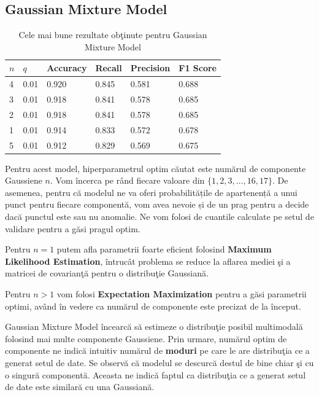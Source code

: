 \noindent

\subsection{Gaussian Mixture Model}

\begin{table}[H]
  \centering
  \begin{tabularx}{\textwidth}{
      |X
      |X
      |X
      |X
      |X
      |X|
  }
  \hline
  $n$ & $q$ & {Accuracy} & {Recall} & {Precision} & {F1 Score} \\
  \hline
  \rowcolor{gray!20} 4 & 0.01 & 0.920 & 0.845 & 0.581 & 0.688  \\
  3	& 0.01 & 0.918	& 0.841 & 0.578 & 0.685 \\
  \rowcolor{gray!20} 2	& 0.01 & 0.918 & 0.841 & 0.578	& 0.685  \\
  1 & 0.01 & 0.914 & 0.833 & 0.572 & 0.678 \\
  \rowcolor{gray!20} 5 & 0.01 & 0.912	& 0.829 & 0.569	& 0.675  \\
  \hline
  \end{tabularx}
  \caption{Cele mai bune rezultate obţinute pentru Gaussian Mixture Model}
\end{table}



Pentru acest model, hiperparametrul optim 
căutat este numărul de componente Gaussiene $n$. Vom încerca pe rând fiecare valoare
din $\{1, 2, 3, \ldots, 16, 17\}$. De asemenea, pentru că modelul 
ne va oferi probabilitățile de apartenență a unui punct pentru 
fiecare componentă, vom avea nevoie și de un prag pentru a decide 
dacă punctul este sau nu anomalie. Ne vom folosi de cuantile 
calculate pe setul de validare pentru a găsi pragul optim.

Pentru $n=1$ putem afla parametrii foarte eficient folosind 
\textbf{Maximum Likelihood Estimation}, întrucât problema 
se reduce la aflarea mediei şi a matricei de 
covarianţă pentru o distribuţie Gaussiană. 

Pentru $n > 1$ vom folosi \textbf{Expectation Maximization} 
pentru a găsi parametrii optimi, 
având în vedere ca numărul de componente este precizat de la început.

Gaussian Mixture Model încearcă să estimeze o distribuţie posibil multimodală 
folosind mai multe componente Gaussiene. Prin urmare, numărul optim de componente
ne indică intuitiv numărul de \textbf{moduri} pe care le are distribuţia ce a generat 
setul de date.
Se observă că modelul se descurcă destul de bine chiar şi cu o singură componentă. 
Aceasta ne indică faptul ca distribuţia ce a generat setul de date este 
similară cu una Gaussiană.


